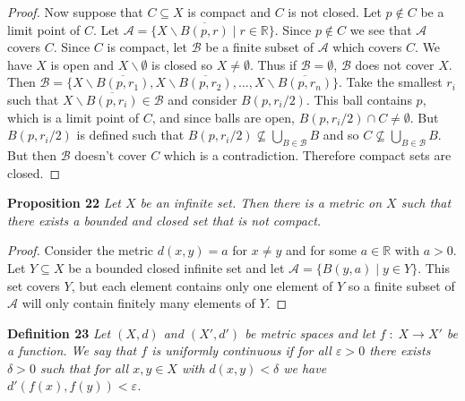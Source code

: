\documentclass{article}
\begin{document}
\begin{flushleft}
\begin{proof}
Now suppose that $C \subseteq X$ is compact and $C$ is not closed. Let $p \notin C$ be a limit point of $C$. Let $\mathcal{A} = \{X \backslash \overline{B(p,r)} \mid r \in \mathbb{R}\}$. Since $p \notin C$ we see that $\mathcal{A}$ covers $C$. Since $C$ is compact, let $\mathcal{B}$ be a finite subset of $\mathcal{A}$ which covers $C$. We have $X$ is open and $X \backslash \emptyset$ is closed so $X \neq \emptyset$. Thus if $\mathcal{B} = \emptyset$, $\mathcal{B}$ does not cover $X$. Then $\mathcal{B} = \{X \backslash \overline{B(p,r_1)}, X \backslash \overline{B(p,r_2)}, \dots , X \backslash \overline{B(p,r_n)}\}$. Take the smallest $r_i$ such that $X \backslash \overline{B(p,r_i)} \in \mathcal{B}$ and consider $B(p,r_i/2)$. This ball contains $p$, which is a limit point of $C$, and since balls are open, $B(p,r_i/2) \cap C \neq \emptyset$. But $B(p,r_i/2)$ is defined such that $B(p,r_i/2) \nsubseteq \bigcup_{B \in \mathcal{B}} B$ and so $C \nsubseteq \bigcup_{B \in \mathcal{B}} B$. But then $\mathcal{B}$ doesn't cover $C$ which is a contradiction. Therefore compact sets are closed.
\end{proof}

\textbf{Proposition 22}
\textsl{Let $X$ be an infinite set. Then there is a metric on $X$ such that there exists a bounded and closed set that is not compact.}
\begin{proof}
Consider the metric $d(x,y) = a$ for $x \neq y$ and for some $a \in \mathbb{R}$ with $a > 0$. Let $Y \subseteq X$ be a bounded closed infinite set and let $\mathcal{A} = \{B(y, a) \mid y \in Y\}$. This set covers $Y$, but each element contains only one element of $Y$ so a finite subset of $\mathcal{A}$ will only contain finitely many elements of $Y$.
\end{proof}

\textbf{Definition 23}
\textsl{Let $(X,d)$ and $(X',d')$ be metric spaces and let $f \; : \; X \rightarrow X'$ be a function. We say that $f$ is uniformly continuous if for all $\varepsilon > 0$ there exists $\delta > 0$ such that for all $x, y \in X$ with $d(x,y) < \delta$ we have $d'(f(x),f(y)) < \varepsilon$.}\newline


\end{flushleft}
\end{document}
